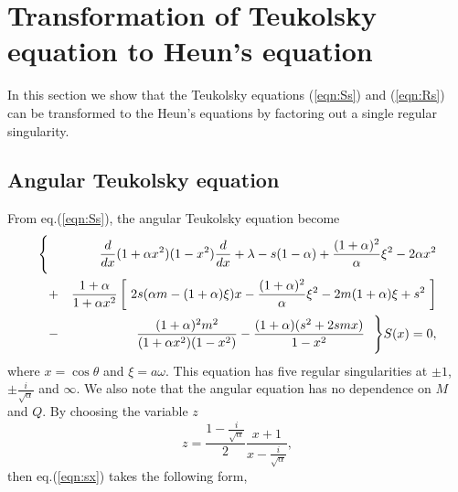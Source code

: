 
\section{Transformation of Teukolsky equation to Heun's equation}
\setcounter{equation}{0}
In this section we show that the Teukolsky equations (\ref{eqn:Ss}) 
and (\ref{eqn:Rs}) can be transformed to the Heun's equations by 
factoring out a single regular singularity.
\subsection{Angular Teukolsky equation} 
From eq.(\ref{eqn:Ss}), the angular Teukolsky equation become 
%
\begin{eqnarray}
\Bigg\{&& \makebox[-0.7cm]{} \frac{d}{dx} ( 1+\alpha x^2 ) (1-x^2) 
\frac{d}{dx}
+ \lambda - s (1-\alpha) + \frac{(1+\alpha)^2}{\alpha} \xi^2
- 2 \alpha x^2 \nonumber \\  
&+& \frac{1+\alpha}{1+\alpha x^2} 
\left[ \ 2s (\alpha m - (1+\alpha) \xi) x 
- \frac{(1+\alpha)^2}{\alpha} \xi^2 
-2 m (1+\alpha) \xi + s^2 \ \right] \nonumber \\ 
&-& \frac{(1+\alpha)^2 m^2}{(1+\alpha x^2) (1-x^2)}
- \frac{(1+\alpha) (s^2 + 2smx)}{1-x^2} \ \ \Bigg\} S(x) = 0, \label{eqn:sx}
\end{eqnarray}
%
where $x = \cos \theta$ and $\xi = a \omega$.
This equation has five regular singularities at $\pm 1$, 
$\pm \frac{i}{\sqrt{\alpha}}$ and $\infty$.
We also note that the angular equation has no dependence on $M$ and $Q$. 
By choosing the variable $z$
$$
z = \frac{1-\frac{i}{\sqrt{\alpha}}}{2} \frac{x+1}{x-\frac{i}{\sqrt{\alpha}}},
$$
then eq.(\ref{eqn:sx}) takes the following form,
%
